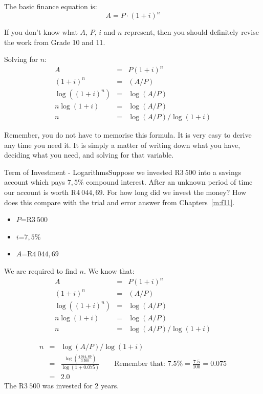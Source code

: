 The basic finance equation is:
\begin{equation*}
A = P \cdot (1+i)^n
\end{equation*}

If you don't know what $A$, $P$, $i$ and $n$ represent, then you should definitely revise the work from Grade 10 and 11.

Solving for $n$:
\begin{eqnarray*}
A &=& P(1+i)^n\\
(1+i)^n &=& (A/P)\\
\log((1+i)^n)&=&\log(A/P)\\
n\log(1+i)&=&\log(A/P)\\
n &=& \log(A/P) / \log(1+i)
\end{eqnarray*}

Remember, you do not have to memorise this formula. It is very easy to derive any time you need it. It is simply a matter of writing down what you have, deciding what you need, and solving for that variable.

\begin{wex}{Term of Investment - Logarithms}{Suppose we invested R$3~500$ into a savings account which pays $7,5\%$ compound interest. After an unknown period of time our account is worth R$4~044,69$. For how long did we invest the money? How does this compare with the trial and error answer from Chapters~\ref{m:f11}.}{
\begin{itemize}
\item{$P$=R$3~500$}
\item{$i$=$7,5$\%}
\item{$A$=R$4~044,69$}
\end{itemize}
We are required to find $n$.
We know that:
\begin{eqnarray*}
A &=& P(1+i)^n\\
(1+i)^n &=& (A/P)\\
\log((1+i)^n)&=&\log(A/P)\\
n\log(1+i)&=&\log(A/P)\\
n &=& \log(A/P) / \log(1+i)
\end{eqnarray*}

\begin{eqnarray*}
n &=& \log(A/P) / \log(1+i)\\
&=&\frac{\log(\frac{4~044,69}{3~500})}{\log(1+0.075)}\qquad \mbox{Remember that: }7.5\%=\frac{7.5}{100}=0.075\\
&=&2.0
\end{eqnarray*}
The R$3~500$ was invested for 2 years.}
\end{wex}


